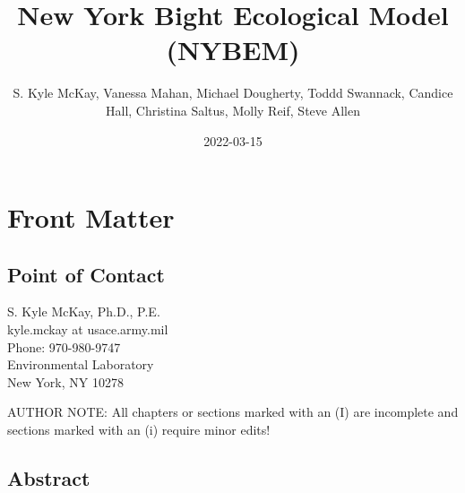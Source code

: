 \documentclass[
]{book}
\title{New York Bight Ecological Model (NYBEM)}
\author{S. Kyle McKay, Vanessa Mahan, Michael Dougherty, Toddd Swannack, Candice Hall, Christina Saltus, Molly Reif, Steve Allen}
\date{2022-03-15}
\begin{document}
\maketitle
{
\setcounter{tocdepth}{1}
\tableofcontents
}
\hypertarget{front-matter}{%
\chapter*{Front Matter}\label{front-matter}}

\hypertarget{point-of-contact}{%
\section*{Point of Contact}\label{point-of-contact}}

S. Kyle McKay, Ph.D., P.E.\\
kyle.mckay at usace.army.mil\\
Phone: 970-980-9747\\
Environmental Laboratory\\
New York, NY 10278

{AUTHOR NOTE: All chapters or sections marked with an (I) are incomplete and sections marked with an (i) require minor edits!}

\hypertarget{abstract}{%
\section*{Abstract}\label{abstract}}
\end{document}
